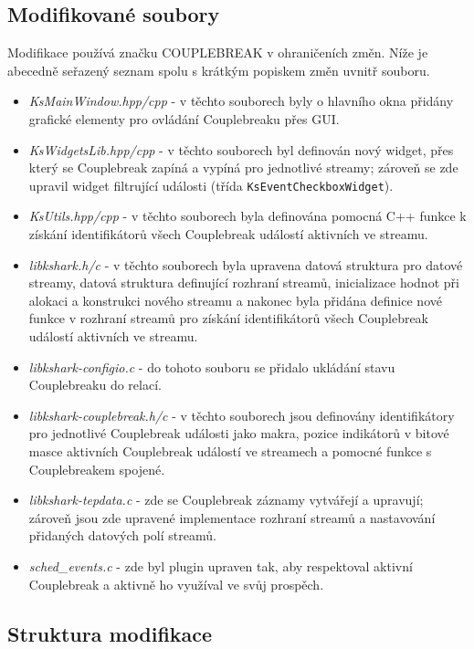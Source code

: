 \subsection{Modifikované soubory}
Modifikace používá značku COUPLEBREAK v ohraničeních změn. Níže je abecedně seřazený seznam spolu s krátkým popiskem změn uvnitř souboru.
\begin{itemize}
    \item \emph{KsMainWindow.hpp/cpp} - v těchto souborech byly o hlavního okna přidány grafické elementy pro ovládání Couplebreaku přes GUI.
    \item \emph{KsWidgetsLib.hpp/cpp} - v těchto souborech byl definován nový widget, přes který se Couplebreak zapíná a vypíná pro jednotlivé streamy; zároveň se zde upravil widget filtrující události (třída \verb|KsEventCheckboxWidget|).
    \item \emph{KsUtils.hpp/cpp} - v těchto souborech byla definována pomocná C++ funkce k získání identifikátorů všech Couplebreak událostí aktivních ve streamu.
    \item \emph{libkshark.h/c} - v těchto souborech byla upravena datová struktura pro datové streamy, datová struktura definující rozhraní streamů, inicializace hodnot při alokaci a konstrukci nového streamu a nakonec byla přidána definice nové funkce v rozhraní streamů pro získání identifikátorů všech Couplebreak událostí aktivních ve streamu.
    \item \emph{libkshark-configio.c} - do tohoto souboru se přidalo ukládání stavu Couplebreaku do relací.
    \item \emph{libkshark-couplebreak.h/c} - v těchto souborech jsou definovány identifikátory pro jednotlivé Couplebreak události jako makra, pozice indikátorů v bitové masce aktivních Couplebreak událostí ve streamech a pomocné funkce s Couplebreakem spojené.
    \item \emph{libkshark-tepdata.c} - zde se Couplebreak záznamy vytvářejí a upravují; zároveň jsou zde upravené implementace rozhraní streamů a nastavování přidaných datových polí streamů.
    \item \emph{sched\_events.c} - zde byl plugin upraven tak, aby respektoval aktivní Couplebreak a aktivně ho využíval ve svůj prospěch.
\end{itemize}

\subsection{Struktura modifikace}

